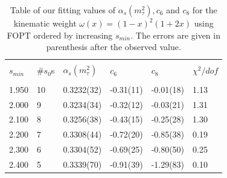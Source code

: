 \documentclass[../../index.tex]{subfiles}
\begin{document}
\begin{table}[H]
  \centering
  \begin{tabular}{llllll}
    \toprule \\
    $s_{min}$ & \#$s_0$s & $\alpha_s(m_\tau^2)$ & $c_6$ & $c_8$ & $\chi^2/dof$  \\
    \hline \\
    1.950 & 10 & 0.3232(32) & -0.31(11) & -0.01(18) & 1.13 \\
    2.000 & 9 & 0.3234(34) & -0.32(12) & -0.03(21) & 1.31 \\
    2.100 & 8 & 0.3256(38) & -0.43(15) & -0.25(28) & 1.30 \\
    \rowcolor{flatUI4}
    2.200 & 7 & 0.3308(44) & -0.72(20) & -0.85(38) & 0.19 \\
    2.300 & 6 & 0.3304(52) & -0.69(25) & -0.80(50) & 0.25 \\
    2.400 & 5 & 0.3339(70) & -0.91(39) & -1.29(83) & 0.10 \\
    \bottomrule
  \end{tabular}
  \caption{Table of our fitting values of $\alpha_s(m_\tau^2), c_6$ and $c_8$ for the kinematic weight
    $\omega(x)=(1-x)^2(1+2x)$ using FOPT ordered by increasing $s_{min}$. The
    errors are given in parenthesis after the observed value.}
  \label{table:fitWKinAlD6D8}
\end{table}
\end{document}
